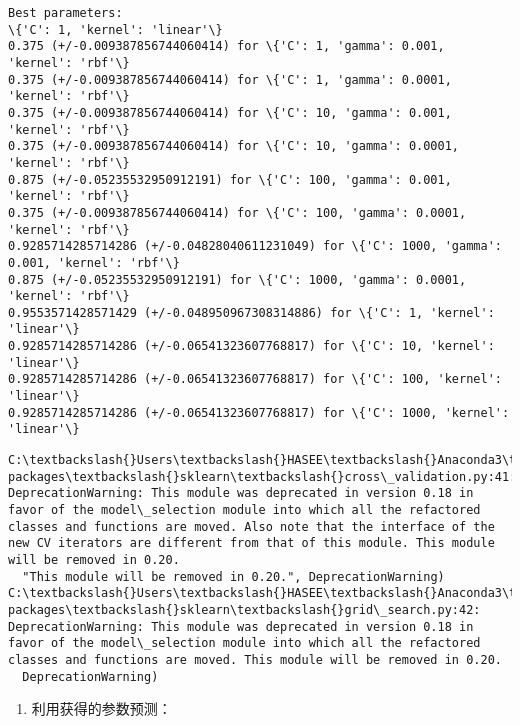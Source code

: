 \documentclass[11pt]{article}
\providecommand{\tightlist}{%
      \setlength{\itemsep}{0pt}\setlength{\parskip}{0pt}}
\begin{document}
    \begin{Verbatim}[commandchars=\\\{\}]
Best parameters: 
\{'C': 1, 'kernel': 'linear'\}
0.375 (+/-0.009387856744060414) for \{'C': 1, 'gamma': 0.001, 'kernel': 'rbf'\}
0.375 (+/-0.009387856744060414) for \{'C': 1, 'gamma': 0.0001, 'kernel': 'rbf'\}
0.375 (+/-0.009387856744060414) for \{'C': 10, 'gamma': 0.001, 'kernel': 'rbf'\}
0.375 (+/-0.009387856744060414) for \{'C': 10, 'gamma': 0.0001, 'kernel': 'rbf'\}
0.875 (+/-0.05235532950912191) for \{'C': 100, 'gamma': 0.001, 'kernel': 'rbf'\}
0.375 (+/-0.009387856744060414) for \{'C': 100, 'gamma': 0.0001, 'kernel': 'rbf'\}
0.9285714285714286 (+/-0.04828040611231049) for \{'C': 1000, 'gamma': 0.001, 'kernel': 'rbf'\}
0.875 (+/-0.05235532950912191) for \{'C': 1000, 'gamma': 0.0001, 'kernel': 'rbf'\}
0.9553571428571429 (+/-0.048950967308314886) for \{'C': 1, 'kernel': 'linear'\}
0.9285714285714286 (+/-0.06541323607768817) for \{'C': 10, 'kernel': 'linear'\}
0.9285714285714286 (+/-0.06541323607768817) for \{'C': 100, 'kernel': 'linear'\}
0.9285714285714286 (+/-0.06541323607768817) for \{'C': 1000, 'kernel': 'linear'\}

    \end{Verbatim}

    \begin{Verbatim}[commandchars=\\\{\}]
C:\textbackslash{}Users\textbackslash{}HASEE\textbackslash{}Anaconda3\textbackslash{}lib\textbackslash{}site-packages\textbackslash{}sklearn\textbackslash{}cross\_validation.py:41: DeprecationWarning: This module was deprecated in version 0.18 in favor of the model\_selection module into which all the refactored classes and functions are moved. Also note that the interface of the new CV iterators are different from that of this module. This module will be removed in 0.20.
  "This module will be removed in 0.20.", DeprecationWarning)
C:\textbackslash{}Users\textbackslash{}HASEE\textbackslash{}Anaconda3\textbackslash{}lib\textbackslash{}site-packages\textbackslash{}sklearn\textbackslash{}grid\_search.py:42: DeprecationWarning: This module was deprecated in version 0.18 in favor of the model\_selection module into which all the refactored classes and functions are moved. This module will be removed in 0.20.
  DeprecationWarning)

    \end{Verbatim}

    \begin{enumerate}
\def\labelenumi{\arabic{enumi}.}
\setcounter{enumi}{2}
\tightlist
\item
  利用获得的参数预测：
\end{enumerate}
\end{document}
